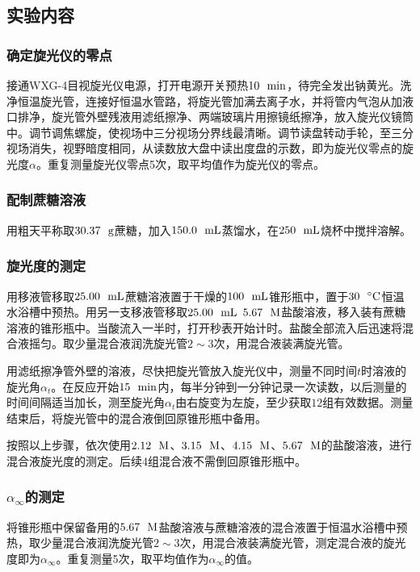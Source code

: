 \documentclass[12pt]{article}
\begin{document}
    	 \subsection{实验内容\citealp{physchemlab}}
			\subsubsection{确定旋光仪的零点}
接通WXG-4目视旋光仪电源，打开电源开关预热$10\ \ {\rm min}$，待完全发出钠黄光。洗净恒温旋光管，连接好恒温水管路，将旋光管加满去离子水，并将管内气泡从加液口排净，旋光管外壁残液用滤纸擦净、两端玻璃片用擦镜纸擦净，放入旋光仪镜筒中。调节调焦螺旋，使视场中三分视场分界线最清晰。调节读盘转动手轮，至三分视场消失，视野暗度相同，从读数放大盘中读出度盘的示数，即为旋光仪零点的旋光度$\alpha$。重复测量旋光仪零点5次，取平均值作为旋光仪的零点。
			\subsubsection{配制蔗糖溶液}
用粗天平称取$30.37\ \ {\rm g}$蔗糖，加入$150.0 \ \ {\rm mL}$蒸馏水，在$250\ \ {\rm mL}$烧杯中搅拌溶解。
			\subsubsection{旋光度的测定}
用移液管移取$25.00 \ \ {\rm mL}$蔗糖溶液置于干燥的$100 \ \ {\rm mL}$锥形瓶中，置于$30\ \ {\rm ^{\circ}C}$恒温水浴槽中预热。用另一支移液管移取$25.00 \ \ {\rm mL}$ $5.67\ \ {\rm M}$盐酸溶液，移入装有蔗糖溶液的锥形瓶中。当酸流入一半时，打开秒表开始计时。盐酸全部流入后迅速将混合液摇匀。取少量混合液润洗旋光管$2\sim 3$次，用混合液装满旋光管。\par 
用滤纸擦净管外壁的溶液，尽快把旋光管放入旋光仪中，测量不同时间$t$时溶液的旋光角$\alpha_{t}$。在反应开始$15\ \ {\rm min}$内，每半分钟到一分钟记录一次读数，以后测量的时间间隔适当加长，测至旋光角$\alpha_{t}$由右旋变为左旋，至少获取$12$组有效数据。测量结束后，将旋光管中的混合液倒回原锥形瓶中备用。\par 
按照以上步骤，依次使用$2.12\ \ {\rm M}$、$3.15\ \ {\rm M}$、$4.15\ \ {\rm M}$、$5.67\ \ {\rm M}$的盐酸溶液，进行混合液旋光度的测定。后续4组混合液不需倒回原锥形瓶中。
	\subsubsection{$\alpha_{\infty}$的测定}
将锥形瓶中保留备用的$5.67\ \ {\rm M}$盐酸溶液与蔗糖溶液的混合液置于恒温水浴槽中预热，取少量混合液润洗旋光管$2\sim 3$次，用混合液装满旋光管，测定混合液的旋光度即为$\alpha_{\infty}$。重复测量5次，取平均值作为$\alpha_{\infty}$的值。
\vbox{}
\end{document}
